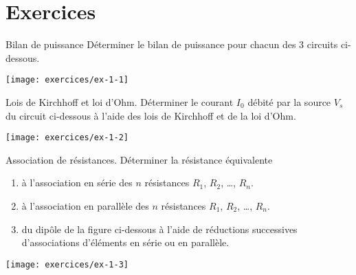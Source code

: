
\section{Exercices}

\begin{exercise}{Bilan de puissance}
\label{ex:1-1}
Déterminer le bilan de puissance pour chacun des 3 circuits ci-dessous.
\begin{center}
\texttt{[image: exercices/ex-1-1]}
\end{center}
\end{exercise}

\begin{exercise}{Lois de Kirchhoff et loi d'Ohm.}
\label{ex:1-2}
Déterminer le courant $I_0$ débité par la source $V_s$ du
circuit ci-dessous à l'aide des lois de Kirchhoff et de
la loi d'Ohm.
\begin{center}
	\texttt{[image: exercices/ex-1-2]}
\end{center}
\end{exercise}

\begin{exercise}{Association de résistances.}
\label{ex:1-3}
Déterminer la résistance équivalente 
\begin{enumerate}
	\item à l'association en série
	des $n$ résistances $R_1$, $R_2$, \ldots, $R_n$.
	\item à l'association en parallèle
	des $n$ résistances $R_1$, $R_2$, \ldots, $R_n$.
	\item du dipôle de la figure ci-dessous
	à l'aide de réductions successives d'associations d'éléments en série
	ou en parallèle.
\end{enumerate}
\begin{center}
	\texttt{[image: exercices/ex-1-3]}
\end{center}

\end{exercise}

